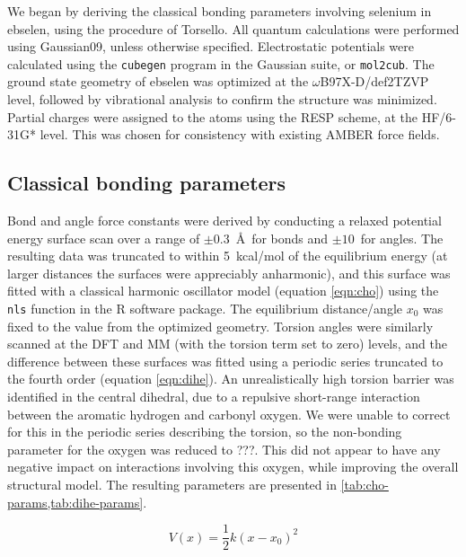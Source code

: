 \begin{refsection}
We began by deriving the classical bonding parameters involving selenium in ebselen, using the procedure of Torsello.\autocite{Torsello2016}
All quantum calculations were performed using Gaussian09, unless otherwise specified.\autocite{Gaussian09}
Electrostatic potentials were calculated using the \texttt{cubegen} program in the Gaussian suite, or \texttt{mol2cub}.\autocite{mol2cub}
The ground state geometry of ebselen was optimized at the $\omega$B97X-D/def2TZVP level, followed by vibrational analysis to confirm the structure was minimized.\autocite{Chai2008,Weigend2005,Weigend2006}
Partial charges were assigned to the atoms using the RESP scheme, at the HF/6-31G* level.\autocite{Cornell1993}
This was chosen for consistency with existing AMBER force fields.

\subsection{Classical bonding parameters}
Bond and angle force constants were derived by conducting a relaxed potential energy surface scan over a range of $\pm0.3$~\AA~for bonds and $\pm10$\degree~for angles.
The resulting data was truncated to within 5~kcal/mol of the equilibrium energy (at larger distances the surfaces were appreciably anharmonic), and this surface was fitted with a classical harmonic oscillator model (equation \cref{eqn:cho}) using the \texttt{nls} function in the R software package.\autocite{R}
The equilibrium distance/angle $x_0$ was fixed to the value from the optimized geometry.
Torsion angles were similarly scanned at the DFT and MM (with the torsion term set to zero) levels, and the difference between these surfaces was fitted using a periodic series truncated to the fourth order (equation \cref{eqn:dihe}).
An unrealistically high torsion barrier was identified in the central  dihedral, due to a repulsive short-range interaction between the aromatic hydrogen and carbonyl oxygen.
We were unable to correct for this in the periodic series describing the torsion, so the non-bonding parameter for the oxygen was reduced to ???.
This did not appear to have any negative impact on interactions involving this oxygen, while improving the overall structural model.
The resulting parameters are presented in \cref{tab:cho-params,tab:dihe-params}.

\begin{equation}
    V(x) = \frac{1}{2} k (x - x_0) ^2
    \label{eqn:cho}
\end{equation}


\end{refsection}

